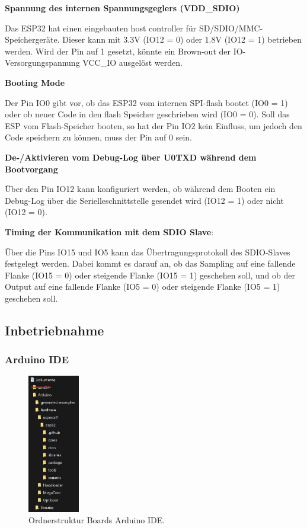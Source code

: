\newpage

\textbf{Spannung des internen Spannungsgeglers (VDD\_SDIO)}

Das ESP32 hat einen eingebauten host controller für SD/SDIO/MMC-Speichergeräte. Dieser kann mit 3.3V (IO12 = 0) oder 1.8V (IO12 = 1) betrieben werden. Wird der Pin auf 1 gesetzt, könnte ein Brown-out der IO-Versorgungspannung VCC\_IO ausgelöst werden.

\textbf{Booting Mode}

Der Pin IO0 gibt vor, ob das ESP32 vom internen SPI-flash bootet (IO0 = 1) oder ob neuer Code in den flash Speicher geschrieben wird (IO0 = 0). Soll das ESP vom Flash-Speicher booten, so hat der Pin IO2 kein Einfluss, um jedoch den Code speichern zu können, muss der Pin auf 0 sein.

\textbf{De-/Aktivieren vom Debug-Log über U0TXD während dem Bootvorgang}

Über den Pin IO12 kann konfiguriert werden, ob während dem Booten ein Debug-Log über die Serielleschnittstelle gesendet wird (IO12 = 1) oder nicht (IO12 = 0).

\textbf{Timing der Kommunikation mit dem SDIO Slave}:

Über die Pins IO15 und IO5 kann das Übertragungsprotokoll des SDIO-Slaves festgelegt werden. Dabei kommt es darauf an, ob das Sampling auf eine fallende Flanke (IO15 = 0) oder steigende Flanke (IO15 = 1) geschehen soll, und ob der Output auf eine fallende Flanke (IO5 = 0) oder steigende Flanke (IO5 = 1) geschehen soll.


\subsection{Inbetriebnahme}

\subsubsection{Arduino IDE}\label{Appendix:ESP32_Arduino_IDE}

\begin{figure}[H]
	\centering
	\includegraphics[width=0.2\textwidth]{graphics/ESP32_Ordner}
	\caption{Ordnerstruktur Boards Arduino IDE.}
	\label{fig:ESP32_Ordner}
\end{figure}

